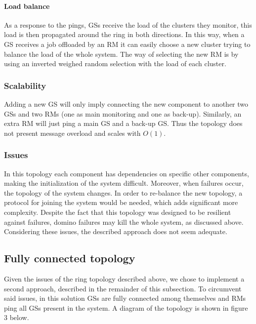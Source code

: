 \paragraph{Load balance}
As a response to the pings, GSs receive the load of the clusters they monitor, this load is then propagated around the ring in both directions. In this way, when a GS receives a job offloaded by an RM it can easily choose a new cluster trying to balance the load of the whole system. The way of selecting the new RM is by using an inverted weighed random selection with the load of each cluster.

\subsubsection{Scalability}
Adding a new GS will only imply connecting the new component to another two GSs and two RMs (one as main monitoring and one as back-up). Similarly, an extra RM will just ping a main GS and a back-up GS. Thus the topology does not present message overload and scales with $O(1)$.

\subsubsection{Issues}
In this topology each component has dependencies on specific other components, making the initialization of the system difficult. Moreover, when failures occur, the topology of the system changes. In order to re-balance the new topology, a protocol for joining the system would be needed, which adds significant more complexity. Despite the fact that this topology was designed to be resilient against failures, domino failures may kill the whole system, as discussed above. Considering these issues, the described approach does not seem adequate.

\subsection{Fully connected topology}
Given the issues of the ring topology described above, we chose to implement a second approach, described in the remainder of this subsection.
To circumvent said issues, in this solution GSs are fully connected among themselves and RMs ping all GSs present in the system. A diagram of the topology is shown in figure 3 below.

